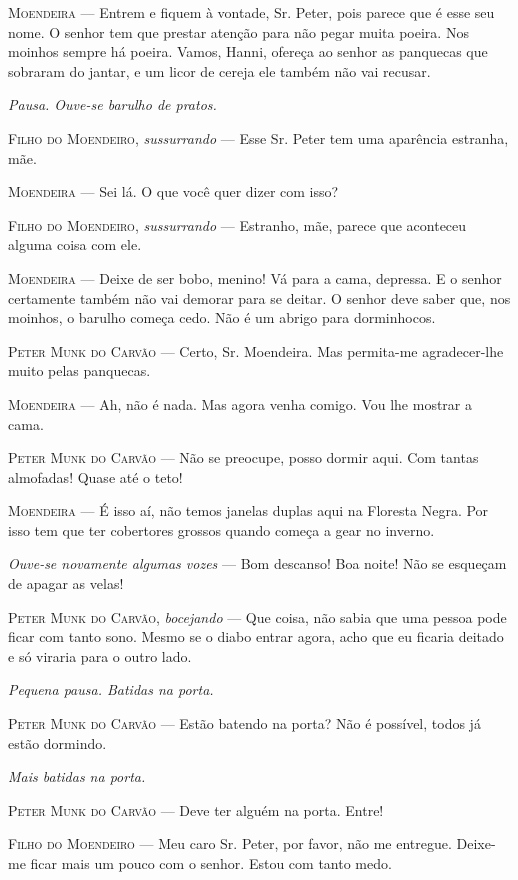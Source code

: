 \begin{myparindent}{0pt}
\begin{Parskip}
\textsc{Moendeira} --- Entrem e fiquem à vontade, Sr. Peter, pois parece que é
esse seu nome. O senhor tem que prestar atenção para não pegar muita
poeira. Nos moinhos sempre há poeira. Vamos, Hanni, ofereça ao senhor as
panquecas que sobraram do jantar, e um licor de cereja ele também não
vai recusar.

\emph{Pausa. Ouve-se barulho de pratos.}

\textsc{Filho do Moendeiro}, \emph{sussurrando} --- Esse Sr. Peter tem uma
aparência estranha, mãe.

\textsc{Moendeira} --- Sei lá. O que você quer dizer com isso?

\textsc{Filho do Moendeiro}, \emph{sussurrando} --- Estranho, mãe, parece que
aconteceu alguma coisa com ele.

\textsc{Moendeira} --- Deixe de ser bobo, menino! Vá para a cama, depressa. E o
senhor certamente também não vai demorar para se deitar. O senhor deve
saber que, nos moinhos, o barulho começa cedo. Não é um abrigo para
dorminhocos.

\textsc{Peter Munk do Carvão} --- Certo, Sr. Moendeira. Mas permita-me
agradecer-lhe muito pelas panquecas.

\textsc{Moendeira} --- Ah, não é nada. Mas agora venha comigo. Vou lhe mostrar a
cama.

\textsc{Peter Munk do Carvão} --- Não se preocupe, posso dormir aqui. Com tantas
almofadas! Quase até o teto!

\textsc{Moendeira} --- É isso aí, não temos janelas duplas aqui na Floresta Negra.
Por isso tem que ter cobertores grossos quando começa a gear no inverno.

\emph{Ouve-se novamente algumas vozes} --- Bom descanso! Boa noite! Não
se esqueçam de apagar as velas!

\textsc{Peter Munk do Carvão}, \emph{bocejando} --- Que coisa, não sabia que uma
pessoa pode ficar com tanto sono. Mesmo se o diabo entrar agora, acho
que eu ficaria deitado e só viraria para o outro lado.

\emph{Pequena pausa. Batidas na porta.}

\textsc{Peter Munk do Carvão} --- Estão batendo na porta? Não é possível, todos já
estão dormindo.

\emph{Mais batidas na porta.}

\textsc{Peter Munk do Carvão} --- Deve ter alguém na porta. Entre!

\textsc{Filho do Moendeiro} --- Meu caro Sr. Peter, por favor, não me entregue.
Deixe-me ficar mais um pouco com o senhor. Estou com tanto medo.


\end{Parskip}
\end{myparindent}
